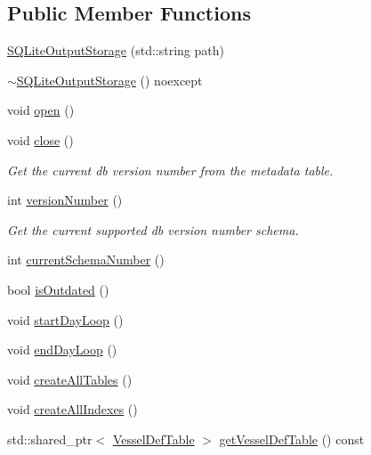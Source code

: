 \subsection*{Public Member Functions}
\begin{DoxyCompactItemize}
\item 
\mbox{\hyperlink{class_s_q_lite_output_storage_a1c2f9b1b795665bcec521f4963509071}{S\+Q\+Lite\+Output\+Storage}} (std\+::string path)
\item 
\mbox{\hyperlink{class_s_q_lite_output_storage_a66f4a8a5ccd66b819640c7bb00a15a6b}{$\sim$\+S\+Q\+Lite\+Output\+Storage}} () noexcept
\item 
void \mbox{\hyperlink{class_s_q_lite_output_storage_accb747707fd50419cea2568acb3f68ba}{open}} ()
\item 
void \mbox{\hyperlink{class_s_q_lite_output_storage_ad3506c2ad743ed965e7e6cbf08d846d0}{close}} ()
\begin{DoxyCompactList}\small\item\em Get the current db version number from the metadata table. \end{DoxyCompactList}\item 
int \mbox{\hyperlink{class_s_q_lite_output_storage_abe6f44858849f2aa51ef7ea27b782447}{version\+Number}} ()
\begin{DoxyCompactList}\small\item\em Get the current supported db version number schema. \end{DoxyCompactList}\item 
int \mbox{\hyperlink{class_s_q_lite_output_storage_a9493d87f401aac870c55e6c1ccc361c7}{current\+Schema\+Number}} ()
\item 
bool \mbox{\hyperlink{class_s_q_lite_output_storage_adad2107c8e0ed61de81afa4bad915679}{is\+Outdated}} ()
\item 
void \mbox{\hyperlink{class_s_q_lite_output_storage_ab56e30576907da1eb48a2287678363c5}{start\+Day\+Loop}} ()
\item 
void \mbox{\hyperlink{class_s_q_lite_output_storage_ab78ec887182f12c0819ee48375071c64}{end\+Day\+Loop}} ()
\item 
void \mbox{\hyperlink{class_s_q_lite_output_storage_a957caed87bd56570b9261b76a83ce32e}{create\+All\+Tables}} ()
\item 
void \mbox{\hyperlink{class_s_q_lite_output_storage_a36bb007364e487bb94677f4b744140ef}{create\+All\+Indexes}} ()
\item 
std\+::shared\+\_\+ptr$<$ \mbox{\hyperlink{class_vessel_def_table}{Vessel\+Def\+Table}} $>$ \mbox{\hyperlink{class_s_q_lite_output_storage_a9d5775767c84794b9963301844d8177d}{get\+Vessel\+Def\+Table}} () const

\end{DoxyCompactItemize}
